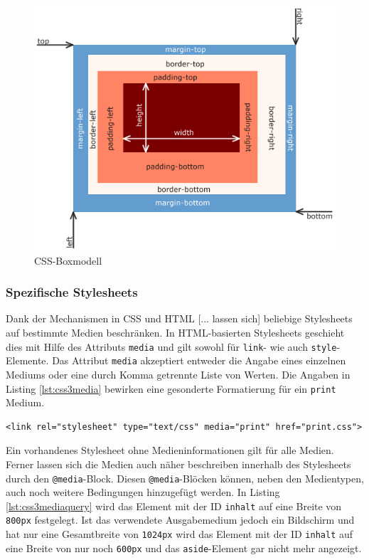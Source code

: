 \vspace{1em}
\begin{figure}[htb]
  \centering
  \includegraphics[width=0.8\linewidth]{abb/css_boxmodell}
  \caption[CSS-Boxmodell]{CSS-Boxmodell\cite{WikiCSS2014}}
  \label{fig:cssboxmodell}
\end{figure}	
	
\subsubsection{Spezifische Stylesheets} \glqq Dank der Mechanismen in CSS und HTML [... lassen sich] beliebige Stylesheets auf bestimmte Medien beschränken. In HTML-basierten Stylesheets geschieht dies mit Hilfe des Attributs \texttt{media} und gilt sowohl für \texttt{link}- wie auch \texttt{style}-Elemente. Das Attribut \texttt{media} akzeptiert entweder die Angabe eines einzelnen Mediums oder eine durch Komma getrennte Liste von Werten.\grqq{}\cite[S.434ff]{MeyeCasc2005} Die Angaben in Listing \ref{lst:css3media} bewirken eine gesonderte Formatierung für ein \texttt{print} Medium.

\vspace{1em}
\begin{lstlisting}[language=HTML5, caption=CSS3 medienspezifisches Stylesheet, label=lst:css3media]
<link rel="stylesheet" type="text/css" media="print" href="print.css">
\end{lstlisting}
	
Ein vorhandenes Stylesheet ohne Medieninformationen gilt für alle Medien. Ferner lassen sich die Medien auch näher beschreiben innerhalb des Stylesheets durch den \texttt{@media}-Block. Diesen \texttt{@media}-Blöcken können, neben den Medientypen, auch noch weitere Bedingungen hinzugefügt werden. In Listing \ref{lst:css3mediaquery} wird das Element mit der ID \texttt{inhalt} auf eine Breite von \texttt{800px} festgelegt. Ist das verwendete Ausgabemedium jedoch ein Bildschirm und hat nur eine Gesamtbreite von \texttt{1024px} wird das Element mit der ID \texttt{inhalt} auf eine Breite von nur noch \texttt{600px} und das \texttt{aside}-Element gar nicht mehr angezeigt.

